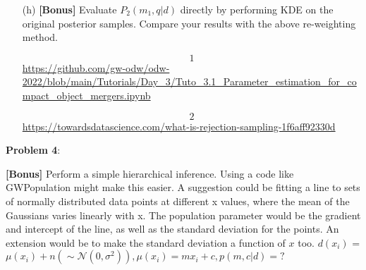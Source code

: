\documentclass{article} %
\newcommand{\question}[2][]{\begin{flushleft}
        \textbf{Problem #1}: %
\end{flushleft}
}
\begin{document}
\begin{enumerate}
\item[(h)]\textbf{[Bonus]} Evaluate $P_2(m_1,q|d)$ directly by performing KDE on the original posterior samples. Compare your results with the above re-weighting method. 

\item[\[1\]] \url{https://github.com/gw-odw/odw-2022/blob/main/Tutorials/Day_3/Tuto_3.1_Parameter_estimation_for_compact_object_mergers.ipynb} \\

\item[\[2\]] \url {https://towardsdatascience.com/what-is-rejection-sampling-1f6aff92330d}
        
    \end{enumerate}
    
    \question[4]{} \textbf{[Bonus]}
    Perform a simple hierarchical inference. Using a code like GWPopulation might make this easier. A suggestion could be fitting a line to sets of normally distributed data points at different x values, where the mean of the Gaussians varies linearly with x. The population parameter would be the gradient and intercept of the line, as well as the standard deviation for the points. An extension would be to make the standard deviation a function of $x$ too. $d(x_i)$ = $\mu(x_i) + n( \sim \mathcal{N}(0, \sigma^2)) , \mu(x_i) = m x_i + c,   p(m,c|d)=?$
\end{document}
